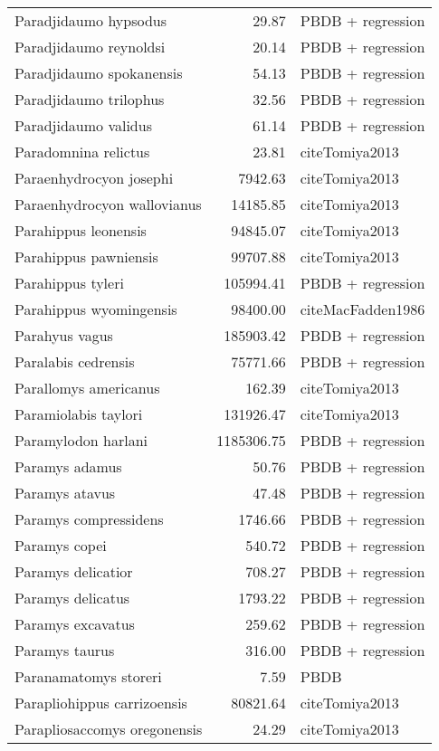 \begin{table}[ht]
\begin{tabular}{lrl}
  Paradjidaumo hypsodus & 29.87 & PBDB + regression \\ 
  Paradjidaumo reynoldsi & 20.14 & PBDB + regression \\ 
  Paradjidaumo spokanensis & 54.13 & PBDB + regression \\ 
  Paradjidaumo trilophus & 32.56 & PBDB + regression \\ 
  Paradjidaumo validus & 61.14 & PBDB + regression \\ 
  Paradomnina relictus & 23.81 & cite{Tomiya2013} \\ 
  Paraenhydrocyon josephi & 7942.63 & cite{Tomiya2013} \\ 
  Paraenhydrocyon wallovianus & 14185.85 & cite{Tomiya2013} \\ 
  Parahippus leonensis & 94845.07 & cite{Tomiya2013} \\ 
  Parahippus pawniensis & 99707.88 & cite{Tomiya2013} \\ 
  Parahippus tyleri & 105994.41 & PBDB + regression \\ 
  Parahippus wyomingensis & 98400.00 & cite{MacFadden1986} \\ 
  Parahyus vagus & 185903.42 & PBDB + regression \\ 
  Paralabis cedrensis & 75771.66 & PBDB + regression \\ 
  Parallomys americanus & 162.39 & cite{Tomiya2013} \\ 
  Paramiolabis taylori & 131926.47 & cite{Tomiya2013} \\ 
  Paramylodon harlani & 1185306.75 & PBDB + regression \\ 
  Paramys adamus & 50.76 & PBDB + regression \\ 
  Paramys atavus & 47.48 & PBDB + regression \\ 
  Paramys compressidens & 1746.66 & PBDB + regression \\ 
  Paramys copei & 540.72 & PBDB + regression \\ 
  Paramys delicatior & 708.27 & PBDB + regression \\ 
  Paramys delicatus & 1793.22 & PBDB + regression \\ 
  Paramys excavatus & 259.62 & PBDB + regression \\ 
  Paramys taurus & 316.00 & PBDB + regression \\ 
  Paranamatomys storeri & 7.59 & PBDB \\ 
  Parapliohippus carrizoensis & 80821.64 & cite{Tomiya2013} \\ 
  Parapliosaccomys oregonensis & 24.29 & cite{Tomiya2013} \\ 

\end{tabular}
\end{table}
